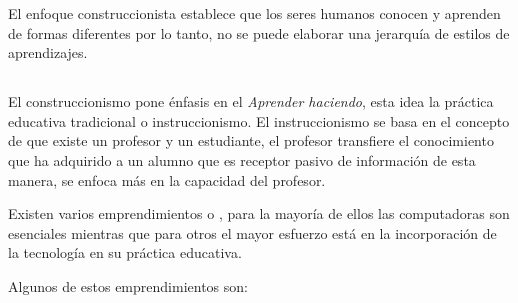 El enfoque construccionista establece que los seres humanos conocen y aprenden
de formas diferentes por lo tanto, no se puede elaborar una jerarquía de estilos
de aprendizajes\cite{valdivia:sg}.

\subsection{}

El construccionismo pone énfasis en el \emph{Aprender haciendo}, esta idea
 la práctica educativa tradicional o instruccionismo. El instruccionismo
se basa en el concepto de que existe un profesor y un estudiante, el profesor
transfiere el conocimiento que ha adquirido a un alumno que es receptor pasivo
de información de esta manera, se enfoca más en la capacidad del profesor. 

Existen varios emprendimientos o \emph{},
para la mayoría de ellos las computadoras son esenciales mientras que para otros
el mayor esfuerzo está en la incorporación de la tecnología en su práctica
educativa\cite{papertian:const}.

Algunos de estos emprendimientos son:

